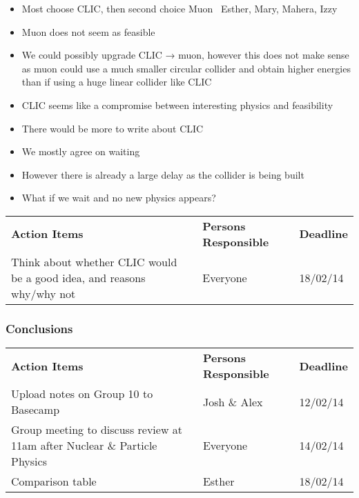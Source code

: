 \begin{itemize}
\item Most choose CLIC, then second choice Muon  \textemdash \, Esther, Mary, Mahera, Izzy
\item Muon does not seem as feasible
\item We could possibly upgrade CLIC → muon, however this does not make sense as muon could use a much smaller circular collider and obtain higher energies than if using a huge linear collider like CLIC
\item CLIC seems like a compromise between interesting physics and feasibility
\item There would be more to write about CLIC
\item We mostly agree on waiting
\item However there is already a large delay as the collider is being built
\item What if we wait and no new physics appears?
\end{itemize}

\begin{tabularx}{\textwidth}{X p{4.5cm} p{1.2cm}}
  \textbf{Action Items} & \textbf{Persons Responsible} & \textbf{Deadline} \\

Think about whether CLIC would be a good idea, and reasons why/why not
& Everyone &
18/02/14 \\

\end{tabularx}

\subsubsection{Conclusions}

\begin{tabularx}{\textwidth}{X p{4.5cm} p{1.2cm}}
  \textbf{Action Items} & \textbf{Persons Responsible} & \textbf{Deadline} \\

Upload notes on Group 10 to Basecamp
& Josh \& Alex &
12/02/14 \\

Group meeting to discuss review at 11am after Nuclear \& Particle Physics
&Everyone & 
14/02/14\\

Comparison table
& Esther &
18/02/14 \\

\end{tabularx}

